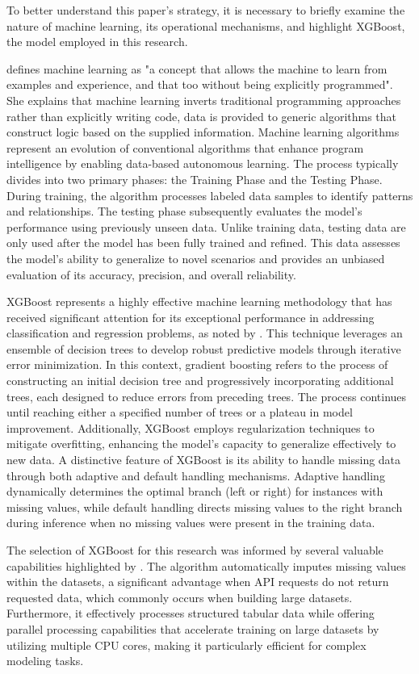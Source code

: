 To better understand this paper's strategy, it is necessary to briefly examine the nature of machine learning, its operational mechanisms, and highlight XGBoost, the model employed in this research.

\textcite{Johari2018MachineExamples} defines machine learning as "a concept that allows the machine to learn from examples and experience, and that too without being explicitly programmed". She explains that machine learning inverts traditional programming approaches rather than explicitly writing code, data is provided to generic algorithms that construct logic based on the supplied information. Machine learning algorithms represent an evolution of conventional algorithms that enhance program intelligence by enabling data-based autonomous learning. The process typically divides into two primary phases: the Training Phase and the Testing Phase. During training, the algorithm processes labeled data samples to identify patterns and relationships. The testing phase subsequently evaluates the model's performance using previously unseen data. Unlike training data, testing data are only used after the model has been fully trained and refined. This data assesses the model's ability to generalize to novel scenarios and provides an unbiased evaluation of its accuracy, precision, and overall reliability.

XGBoost represents a highly effective machine learning methodology that has received significant attention for its exceptional performance in addressing classification and regression problems, as noted by \textcite{Harrison2023EffectiveModels}. This technique leverages an ensemble of decision trees to develop robust predictive models through iterative error minimization. In this context, gradient boosting refers to the process of constructing an initial decision tree and progressively incorporating additional trees, each designed to reduce errors from preceding trees. The process continues until reaching either a specified number of trees or a plateau in model improvement. Additionally, XGBoost employs regularization techniques to mitigate overfitting, enhancing the model's capacity to generalize effectively to new data. A distinctive feature of XGBoost is its ability to handle missing data through both adaptive and default handling mechanisms. Adaptive handling dynamically determines the optimal branch (left or right) for instances with missing values, while default handling directs missing values to the right branch during inference when no missing values were present in the training data.

The selection of XGBoost for this research was informed by several valuable capabilities highlighted by \textcite{Harrison2023EffectiveModels}. The algorithm automatically imputes missing values within the datasets, a significant advantage when API requests do not return requested data, which commonly occurs when building large datasets. Furthermore, it effectively processes structured tabular data while offering parallel processing capabilities that accelerate training on large datasets by utilizing multiple CPU cores, making it particularly efficient for complex modeling tasks.
